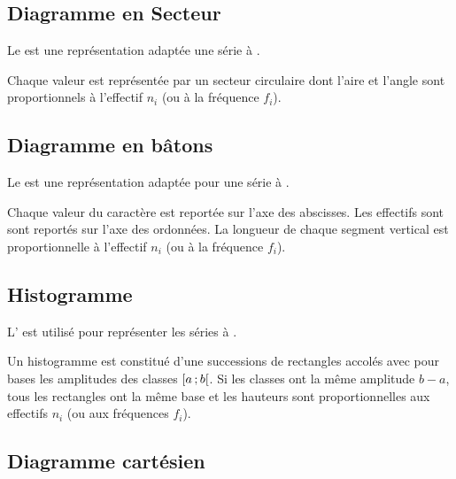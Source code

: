 \documentclass[12pt,a4paper]{article}
\begin{document}
\subsection{Diagramme en Secteur}

\begin{mybox}

		

	 Le  est une représentation adaptée une série à .
	
	 Chaque valeur est représentée par un secteur circulaire dont l'aire et l'angle sont proportionnels à l'effectif $n_i$ (ou à la fréquence $f_i$).
	
\end{mybox}	




\subsection{Diagramme en bâtons}

\begin{mybox}
	Le  est une représentation adaptée pour une série à .
	
	Chaque valeur du caractère est reportée sur l'axe des abscisses. Les effectifs sont sont reportés sur l'axe des ordonnées.
	La longueur de chaque segment vertical est proportionnelle à l'effectif $n_i$ (ou à la fréquence $f_i$).
\end{mybox}


\subsection{Histogramme}

\begin{mybox}
	L' est utilisé pour représenter les séries à .
	
	Un histogramme est constitué d'une successions de rectangles accolés avec pour bases les amplitudes des classes $\mbox{\ensuremath{\left[a\mathpunct{};b\right[}}$.
	Si les classes ont la même amplitude $b - a$, tous les rectangles ont la même base et les hauteurs sont proportionnelles aux effectifs $n_i$ (ou aux fréquences $f_i$).
\end{mybox}	



\subsection{Diagramme cartésien}
\end{document}

